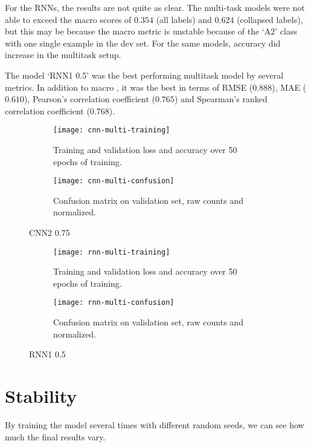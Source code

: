 For the RNNs, the results are not quite as clear. The multi-task models were
not able to exceed the macro \FI scores of $0.354$ (all labels) and $0.624$
(collapsed labels), but this may be because the macro \FI metric is unstable
because of the `A2' class with one single example in the dev set. For the
same models, accuracy did increase in the multitask setup.

The model `RNN1 0.5' was the best performing multitask model by several
metrics. In addition to macro \FI, it was the best in terms of RMSE
($0.888$), MAE ($0.610$), Pearson's correlation coefficient ($0.765$) and
Spearman's ranked correlation coefficient ($0.768$).


\begin{figure}
  \begin{subfigure}{\linewidth}
    \centering
    \texttt{[image: cnn-multi-training]}
    \caption{Training and validation loss and accuracy over 50 epochs of training.}
  \end{subfigure}
  \begin{subfigure}{\linewidth}
    \centering
    \texttt{[image: cnn-multi-confusion]}
    \caption{Confusion matrix on validation set, raw counts and normalized.}
  \end{subfigure}
  \caption{CNN2 0.75}
  \label{fig:rnn-training}
\end{figure}

\begin{figure}
  \begin{subfigure}{\linewidth}
    \centering
    \texttt{[image: rnn-multi-training]}
    \caption{Training and validation loss and accuracy over 50 epochs of training.}
  \end{subfigure}
  \begin{subfigure}{\linewidth}
    \centering
    \texttt{[image: rnn-multi-confusion]}
    \caption{Confusion matrix on validation set, raw counts and normalized.}
  \end{subfigure}
  \caption{RNN1 0.5}
  \label{fig:rnn-training}
\end{figure}

\section{Stability}

By training the model several times with different random seeds, we can see
how much the final results vary.
